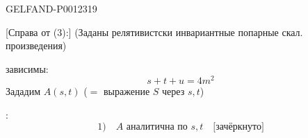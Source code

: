 \begin{GelfandAdjacentEvidence}{GELFAND-P001231}{9}

[Справа от (3):] (Заданы релятивистски инвариантные попарные скал. произведения)

зависимы:
\begin{equation*}
s+t+u=4m^2\tag{4}
\end{equation*}
Зададим \(A(s,t)\) (\(=\) выражение \(S\) через \(s,t\))

:
\begin{equation*}
1)\quad A\text{ аналитична по }s,t\quad\text{[зачёркнуто]}\tag{5}
\end{equation*}
\end{GelfandAdjacentEvidence}



